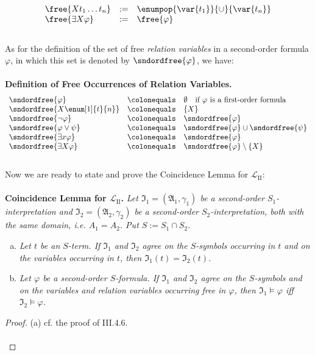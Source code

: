 \begin{enumerate}[1.]
\begin{enumerate}[(1)]
\[
\begin{array}{lll}
\free{X t_1 \ldots t_n}  & := & \enumpop{\var{t_1}}{\cup}{\var{t_n}} \cr
\free{\exists X \varphi} & := & \free{\varphi}
\end{array}
\]
\ \\
As for the definition of the set of free \emph{relation variables} in a second-order formula $\varphi$, in which this set is denoted by $\sndordfree{\varphi}$, we have:\\
\ \\
\textbf{Definition of Free Occurrences of Relation Variables.}
\[
\begin{array}{lll}
\sndordfree{\varphi}           & \colonequals & \emptyset \quad \mbox{if \(\varphi\) is a first-order formula} \cr
\sndordfree{X\enum[1]{t}{n}}   & \colonequals & \{ X \} \cr
\sndordfree{\neg\varphi}       & \colonequals & \sndordfree{\varphi} \cr
\sndordfree{\varphi\lor \psi}  & \colonequals & \sndordfree{\varphi} \cup \sndordfree{\psi} \cr
\sndordfree{\exists x\varphi}  & \colonequals & \sndordfree{\varphi} \cr
\sndordfree{\exists X\varphi}  & \colonequals & \sndordfree{\varphi} \setminus \{ X \}
\end{array}
\]
\ \\
Now we are ready to state and prove the Coincidence Lemma for $\mathcal{L}_\mathrm{II}$:\\
\\
\textbf{Coincidence Lemma for $\mathcal{L}_\mathrm{II}$.} \emph{Let $\mathfrak{I}_1 = (\mathfrak{A}_1, \gamma_1)$ be a second-order $S_1$-interpretation and $\mathfrak{I}_2 = (\mathfrak{A}_2, \gamma_2)$ be a second-order $S_2$-interpretation, both with the same domain, i.e. $A_1 = A_2$. Put $S := S_1 \cap S_2$.}
\begin{enumerate}[(a)]
\item \emph{Let $t$ be an $S$-term. If $\mathfrak{I}_1$ and $\mathfrak{I}_2$ agree on the $S$-symbols occurring in $t$ and on the variables occurring in $t$, then $\mathfrak{I}_1(t) = \mathfrak{I}_2(t)$.}
\item \emph{Let $\varphi$ be a second-order $S$-formula. If $\mathfrak{I}_1$ and $\mathfrak{I}_2$ agree on the $S$-symbols and on the variables and relation variables occurring free in $\varphi$, then $\mathfrak{I}_1 \models \varphi$ iff $\mathfrak{I}_2 \models \varphi$.}
\end{enumerate}
\begin{proof} (a) cf. the proof of III.4.6.\\
\ \\

\end{proof}
\end{enumerate}
\end{enumerate}
